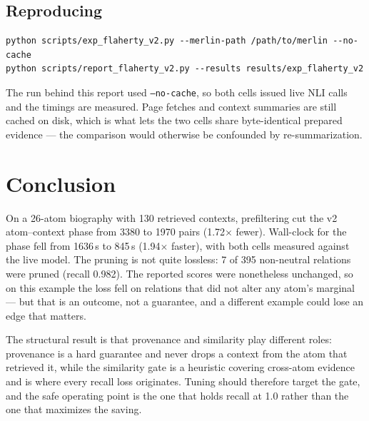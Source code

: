 \documentclass[11pt]{article}
\begin{document}
\subsection{Reproducing}
\begin{verbatim}
python scripts/exp_flaherty_v2.py --merlin-path /path/to/merlin --no-cache
python scripts/report_flaherty_v2.py --results results/exp_flaherty_v2
\end{verbatim}
The run behind this report used \texttt{--no-cache}, so both cells issued live NLI calls and the timings are measured. Page fetches and context summaries are still cached on disk, which is what lets the two cells share byte-identical prepared evidence --- the comparison would otherwise be confounded by re-summarization.
\section{Conclusion}
On a 26-atom biography with 130 retrieved contexts, prefiltering cut the v2 atom--context phase from 3380 to 1970 pairs (1.72$\times$ fewer). Wall-clock for the phase fell from 1636\,s to 845\,s (1.94$\times$ faster), with both cells measured against the live model. The pruning is not quite lossless: 7 of 395 non-neutral relations were pruned (recall 0.982). The reported scores were nonetheless unchanged, so on this example the loss fell on relations that did not alter any atom's marginal --- but that is an outcome, not a guarantee, and a different example could lose an edge that matters.

The structural result is that provenance and similarity play different roles: provenance is a hard guarantee and never drops a context from the atom that retrieved it, while the similarity gate is a heuristic covering cross-atom evidence and is where every recall loss originates. Tuning should therefore target the gate, and the safe operating point is the one that holds recall at 1.0 rather than the one that maximizes the saving.
\end{document}
